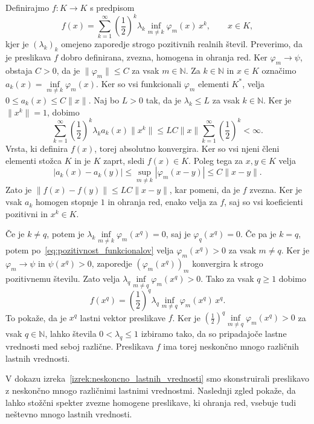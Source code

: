 \documentclass[mat2, tisk]{fmfdelo}
\newcommand{\N}{\mathbb{N}}
\begin{document}
\begin{dokaz}
Definirajmo $f\colon K\longrightarrow K$ s predpisom
\[
f(x)
=
\sum_{k=1}^{\infty}
\left(\frac12\right)^k
\lambda_k
\inf\limits_{m\neq k}\varphi_m(x)\,x^k,
\qquad x\in K,
\]
kjer je $(\lambda_k)_k$ omejeno zaporedje strogo pozitivnih realnih
števil. 
Preverimo, da je preslikava $f$ dobro definirana, zvezna, homogena in
ohranja red. Ker $\varphi_m\longrightarrow\psi$, obstaja $C>0$, da
je $\|\varphi_m\|\leq C$ za vsak $m\in\N$. Za $k\in\N$ in $x\in K$
označimo $a_k(x)=\inf\limits_{m\neq k}\varphi_m(x)$. Ker so vsi funkcionali
$\varphi_m$ elementi $K^*$, velja $0\leq a_k(x)\leq C\|x\|$.
Naj bo $L>0$ tak, da je $\lambda_k\leq L$ za vsak $k\in\N$.
Ker je $\|x^k\|=1$, dobimo
\[
\sum\limits_{k=1}^{\infty}\left(\frac12\right)^k
\lambda_k a_k(x)\|x^k\|
\leq LC\|x\|\sum\limits_{k=1}^{\infty}\left(\frac12\right)^k<\infty.
\]
Vrsta, ki definira $f(x)$, torej absolutno konvergira. Ker so vsi njeni
členi elementi stožca $K$ in je $K$ zaprt, sledi $f(x)\in K$. Poleg tega za
$x,y\in K$ velja
\[
|a_k(x)-a_k(y)|
\leq\sup\limits_{m\neq k}|\varphi_m(x-y)|
\leq C\|x-y\|.
\]
Zato je $\|f(x)-f(y)\|\leq LC\|x-y\|$, kar pomeni, da je $f$
zvezna. Ker je vsak $a_k$ homogen stopnje $1$ in ohranja red, enako
velja za $f$, saj so vsi koeficienti pozitivni in $x^k\in K$.

Če je $k\neq q$, potem je
$\lambda_k\inf\limits_{m\neq k}\varphi_m(x^q)=0$,
saj je $\varphi_q(x^q)=0$. Če pa je $k=q$, potem po~\eqref{eq:pozitivnost_funkcionalov} velja
$\varphi_m(x^q)>0$ za vsak $m\neq q$. Ker je
$\varphi_m\longrightarrow\psi$ in $\psi(x^q)>0$, zaporedje
$(\varphi_m(x^q))_m$ konvergira k strogo pozitivnemu številu.
Zato velja
$\lambda_q\inf\limits_{m\neq q}\varphi_m(x^q)>0$.
Tako za vsak $q\geq1$ dobimo
\[
f(x^q)
=
\left(\frac12\right)^q
\lambda_q
\inf\limits_{m\neq q}\varphi_m(x^q)\,x^q.
\]
To pokaže, da je $x^q$ lastni vektor preslikave $f$. Ker je 
$\left(\frac12\right)^q\inf\limits_{m\neq q}\varphi_m(x^q)>0$
za vsak $q\in\N$, lahko števila $0<\lambda_q\leq1$ izbiramo
tako, da so pripadajoče lastne vrednosti med seboj
različne. Preslikava $f$ ima torej neskončno mnogo različnih
lastnih vrednosti.
\end{dokaz}

V dokazu izreka~\ref{izrek:neskoncno_lastnih_vrednosti} smo
skonstruirali preslikavo z neskončno mnogo različnimi lastnimi
vrednostmi. Naslednji zgled pokaže, da lahko stožčni spekter
zvezne homogene preslikave, ki ohranja red, vsebuje tudi neštevno
mnogo lastnih vrednosti.
\end{document}

